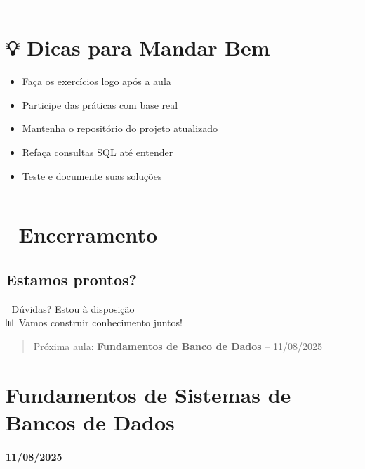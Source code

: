 \documentclass[
]{book}
\providecommand{\tightlist}{%
  \setlength{\itemsep}{0pt}\setlength{\parskip}{0pt}}
\begin{document}
\begin{center}\rule{0.5\linewidth}{0.5pt}\end{center}

\chapter{💡 Dicas para Mandar Bem}\label{dicas-para-mandar-bem}

\begin{itemize}
\tightlist
\item
  Faça os exercícios logo após a aula
\item
  Participe das práticas com base real
\item
  Mantenha o repositório do projeto atualizado
\item
  Refaça consultas SQL até entender
\item
  Teste e documente suas soluções
\end{itemize}

\begin{center}\rule{0.5\linewidth}{0.5pt}\end{center}

\chapter{🙌 Encerramento}\label{encerramento}

\section{Estamos prontos?}\label{estamos-prontos}

📧 Dúvidas? Estou à disposição\\
📊 Vamos construir conhecimento juntos!

\begin{quote}
Próxima aula: \textbf{Fundamentos de Banco de Dados} -- 11/08/2025
\end{quote}

\chapter{Fundamentos de Sistemas de Bancos de Dados}\label{fundamentos-de-sistemas-de-bancos-de-dados}

\subsubsection*{11/08/2025}\label{section-1}
\end{document}
